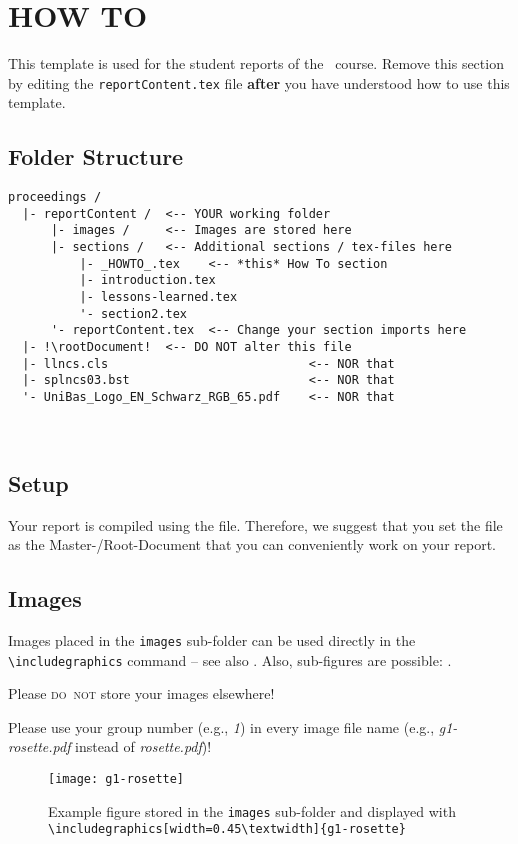 \section*{HOW TO}
This template is used for the student reports of the \coursename\ course. Remove this section by editing the \texttt{reportContent.tex} file \textbf{after} you have understood how to use this template.

\subsection*{Folder Structure}
\begin{lstlisting}[escapechar=!]
proceedings /
  |- reportContent /  <-- YOUR working folder
      |- images /     <-- Images are stored here
      |- sections /   <-- Additional sections / tex-files here
          |- _HOWTO_.tex    <-- *this* How To section
          |- introduction.tex
          |- lessons-learned.tex
          '- section2.tex
      '- reportContent.tex  <-- Change your section imports here
  |- !\rootDocument!  <-- DO NOT alter this file
  |- llncs.cls                            <-- NOR that
  |- splncs03.bst                         <-- NOR that
  '- UniBas_Logo_EN_Schwarz_RGB_65.pdf    <-- NOR that
\end{lstlisting}
\ 

\subsection*{Setup}
Your report is compiled using the \texttt{\rootDocument} file. Therefore, we suggest that you set the file \texttt{\rootDocument} as the Master-/Root-Document that you can conveniently work on your report. 


\subsection*{Images}
Images placed in the \texttt{images} sub-folder can be used directly in the \texttt{\textbackslash includegraphics} command -- see also . Also, sub-figures are possible: .

Please \textsc{do~not} store your images elsewhere! 

Please use your group number (e.g., \textit{1}) in every image file name (e.g., \textit{g1-rosette.pdf} instead of \textit{rosette.pdf})!

\begin{figure}[tb]
\centering
\texttt{[image: g1-rosette]}
\caption{Example figure stored in the \texttt{images} sub-folder and displayed with \texttt{\textbackslash includegraphics[width=0.45\textbackslash textwidth]\{g1-rosette\}}}
\label{fig:rosette}
\end{figure}

